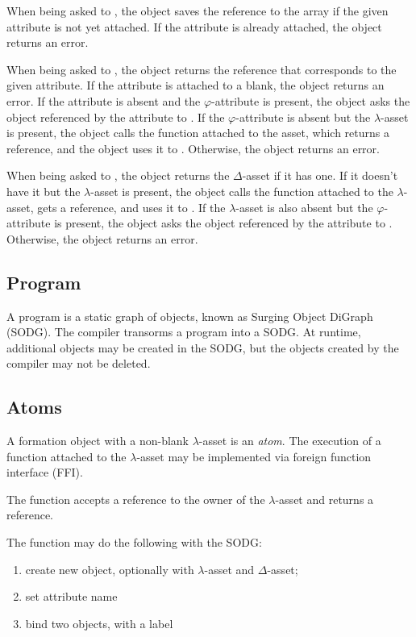 When being asked to , the object saves the reference to the array if the given attribute is not yet attached.
If the attribute is already attached, the object returns an error.

When being asked to , the object returns the reference that corresponds to the given attribute.
If the attribute is attached to a blank, the object returns an error.
If the attribute is absent and the \(\varphi\)-attribute is present, the object asks the object referenced by the attribute to .
If the \(\varphi\)-attribute is absent but the \(\lambda\)-asset is present, the object calls the function attached to the asset, which returns a reference, and the object uses it to .
Otherwise, the object returns an error.

When being asked to , the object returns the \(\Delta\)-asset if it has one.
If it doesn't have it but the \(\lambda\)-asset is present, the object calls the function attached to the \(\lambda\)-asset, gets a reference, and uses it to .
If the \(\lambda\)-asset is also absent but the \(\varphi\)-attribute is present, the object asks the object referenced by the attribute to .
Otherwise, the object returns an error.

\subsection{Program}

A program is a static graph of objects, known as Surging Object DiGraph (SODG).
The compiler transorms a program into a SODG.
At runtime, additional objects may be created in the SODG, but the objects created by the compiler may not be deleted.

\subsection{Atoms}

A formation object with a non-blank \(\lambda\)-asset is an \emph{atom}.
The execution of a function attached to the \(\lambda\)-asset may be implemented via foreign function interface (FFI).

The function accepts a reference to the owner of the \(\lambda\)-asset and returns a reference.

The function may do the following with the SODG:
\begin{enumerate}
  \item create new object, optionally with \(\lambda\)-asset and \(\Delta\)-asset;
  \item set attribute name
  \item bind two objects, with a label
\end{enumerate}

